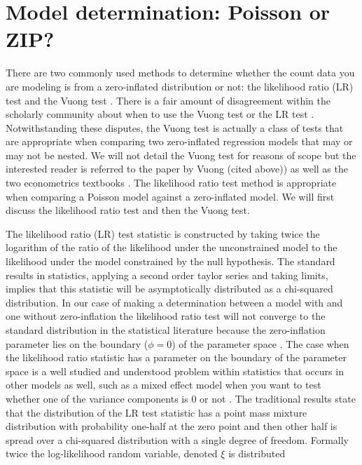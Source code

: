 \documentclass{article}
\begin{document}
\section{Model determination: Poisson or ZIP?}
There are two commonly used methods to determine whether the count data you are modeling is from a zero-inflated distribution or not: the likelihood ratio (LR) test and the Vuong test \cite{vuong1989likelihood}.  
There is a fair amount of disagreement within the scholarly community about when to use the Vuong test or the LR test \cite{wilson2015misuse}. Notwithstanding these disputes, the Vuong test is actually a class of tests that are appropriate when comparing two zero-inflated regression models that may or may not be nested. We will not detail the Vuong test for reasons of scope but the interested reader is referred to the paper by Vuong (cited above)) as well as the two econometrics textbooks \cite{2005estimation,davidson1995estimation}. The likelihood ratio test method is appropriate when comparing a Poisson model against a zero-inflated model. We will first discuss the likelihood ratio test and then the Vuong test. 

The likelihood ratio (LR) test statistic is constructed by taking twice the logarithm of the ratio of the likelihood under the unconstrained model to the likelihood under the model constrained by the null hypothesis. The standard results in statistics, applying a second order taylor series and taking limits, implies that this statistic will be asymptotically distributed as a chi-squared distribution. In our case of making a determination between a model with and one without zero-inflation the likelihood ratio test will not converge to the standard distribution in the statistical literature because the zero-inflation parameter lies on the boundary ($\phi=0$) of the parameter space \cite{chernoff1954distribution,feng1992statistical,self1987asymptotic}. The case when the likelihood ratio statistic has a parameter on the boundary of the parameter space is a well studied and understood problem within statistics that occurs in other models as well, such as a mixed effect model when you want to test whether one of the variance components is 0 or not \cite{crainiceanu2004likelihood}. The traditional results state that the distribution of the LR test statistic has a point mass mixture distribution with probability one-half at the zero point and then other half is spread over a chi-squared distribution with a single degree of freedom. Formally twice the log-likelihood random variable, denoted $\xi$ is distributed 
\end{document}
